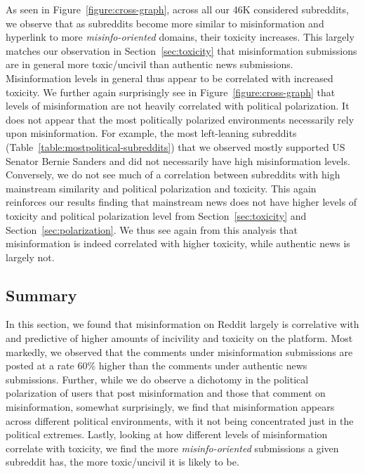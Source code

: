 As seen in Figure~\ref{figure:cross-graph}, across all our 46K considered subreddits, we observe that as subreddits become more similar to misinformation and hyperlink to more \textit{misinfo-oriented} domains, their toxicity increases. This largely matches our observation in Section~\ref{sec:toxicity} that misinformation submissions are in general more toxic/uncivil than authentic news submissions. Misinformation levels in general thus appear to be correlated with increased toxicity. We further again surprisingly see in Figure~\ref{figure:cross-graph} that levels of misinformation are not heavily correlated with political polarization. It does not appear that the most politically polarized environments necessarily rely upon misinformation. For example, the most left-leaning subreddits (Table~\ref{table:mostpolitical-subreddits}) that we observed mostly supported US Senator Bernie Sanders and did not necessarily have high misinformation levels. Conversely, we do not see much of a correlation between subreddits with high mainstream similarity and political polarization and toxicity. This again reinforces our results finding that mainstream news does not have higher levels of toxicity and political polarization level from Section~\ref{sec:toxicity} and Section~\ref{sec:polarization}. We thus see again from this analysis that misinformation is indeed correlated with higher toxicity, while authentic news is largely not. 


\subsection{Summary}
In this section, we found that misinformation on Reddit largely is correlative with and predictive of higher amounts of incivility and toxicity on the platform. Most markedly, we observed that the comments under misinformation submissions are posted at a rate 60\% higher than the comments under authentic news submissions. Further, while we do observe a dichotomy in the political polarization of users that post misinformation and those that comment on misinformation, somewhat surprisingly, we find that misinformation appears across different political environments, with it not being concentrated just in the political extremes. Lastly, looking at how different levels of misinformation correlate with toxicity, we find the more \textit{misinfo-oriented} submissions a given subreddit has, the more toxic/uncivil it is likely to be. 

 